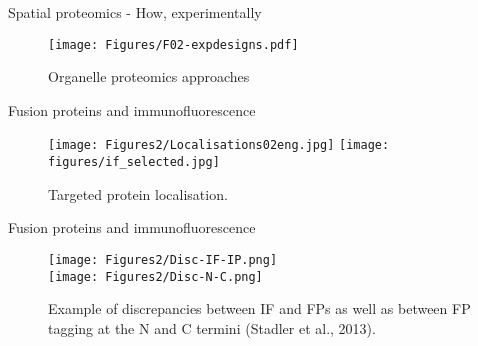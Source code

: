 \begin{frame}{Spatial proteomics - How, experimentally}
  \begin{figure}
    \texttt{[image: Figures/F02-expdesigns.pdf]}
    \caption{Organelle proteomics approaches \citep{Gatto:2010}}
  \end{figure}
\end{frame}



\begin{frame}{Fusion proteins and immunofluorescence}

  \begin{figure}[h]
    \centering
    \texttt{[image: Figures2/Localisations02eng.jpg]}        
    \texttt{[image: figures/if\_selected.jpg]}    
    \caption{Targeted protein localisation.}
  \end{figure}
\end{frame}

\begin{frame}{Fusion proteins and immunofluorescence}
  \begin{figure}
    \centering
    \texttt{[image: Figures2/Disc-IF-IP.png]} \\
    \texttt{[image: Figures2/Disc-N-C.png]}
    \caption{Example of discrepancies between IF and FPs as well as
      between FP tagging at the N and C termini (Stadler et al., 2013).}
  \end{figure}
\end{frame}

